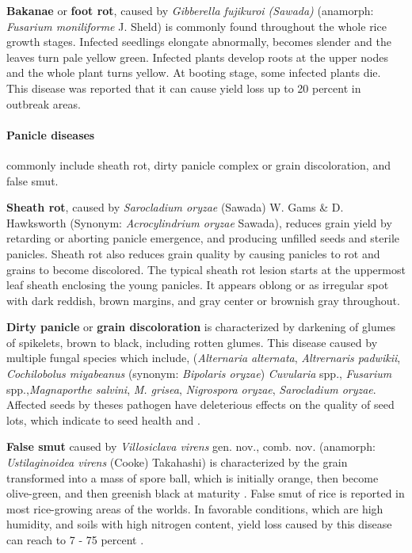 \documentclass[12pt, oneside]{report}
\begin{document}
\textbf{Bakanae} or \textbf{foot rot}, caused by \textit{Gibberella fujikuroi (Sawada)} (anamorph: \textit{Fusarium moniliforme} J. Sheld) is commonly found throughout the whole rice growth stages.  Infected seedlings elongate abnormally, becomes slender and the leaves turn pale yellow green. Infected plants develop roots at the upper nodes and the whole plant turns yellow. At booting stage, some infected plants die. This disease was reported that it can cause yield loss up to 20 percent in outbreak areas.

\paragraph{Panicle diseases} commonly include sheath rot, dirty panicle complex or grain discoloration, and false smut.

\textbf{Sheath rot}, caused by \textit{Sarocladium oryzae} (Sawada) W. Gams \& D. Hawksworth (Synonym: \textit{Acrocylindrium oryzae} Sawada), reduces grain yield by retarding or aborting panicle emergence, and producing unfilled seeds and sterile panicles. Sheath rot also reduces grain quality by causing panicles to rot and grains to become discolored. The typical sheath rot lesion starts at the uppermost leaf sheath enclosing the young panicles. It appears oblong or as irregular spot with dark reddish, brown margins, and gray center or brownish gray throughout. 

\textbf{Dirty panicle} or \textbf{grain discoloration} is characterized by darkening of glumes of spikelets, brown to black, including rotten glumes. This disease caused by multiple fungal species which include, (\textit{Alternaria alternata}, \textit{Altrernaris padwikii}, \textit{Cochilobolus miyabeanus} (synonym: \textit{Bipolaris oryzae}) \textit{Cuvularia} spp., \textit {Fusarium} spp.,\textit{Magnaporthe salvini}, \textit{M. grisea}, \textit{Nigrospora oryzae}, \textit{Sarocladium oryzae}. Affected seeds by theses pathogen have deleterious effects on the quality of seed lots, which indicate to seed health \citep{ouricedisease} and \citep{mew2002handbook}.
 
\textbf{False smut} caused by \textit{Villosiclava virens} gen. nov., comb. nov. (anamorph: \textit{Ustilaginoidea virens} (Cooke) Takahashi) is characterized by the grain transformed into a mass of spore ball, which is initially orange, then become olive-green, and then greenish black at maturity \citep{tanaka2008villosiclava}. False smut of rice is reported in most rice-growing areas of the worlds. In favorable conditions, which are high humidity, and soils with high nitrogen content, yield loss caused by this disease can reach to 7 - 75 percent \citep{ouricedisease}. 
\end{document}
